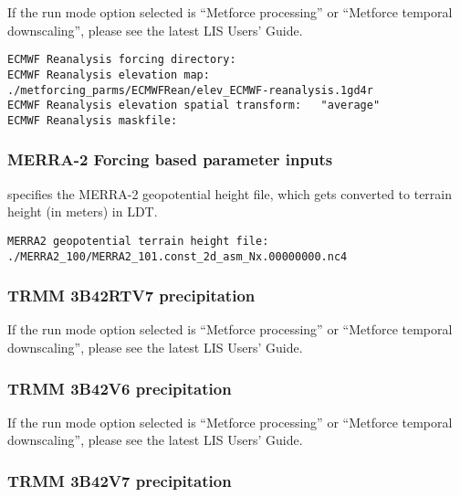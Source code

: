 If the run mode option selected is ``Metforce processing'' or
 ``Metforce temporal downscaling'', please see the latest LIS Users'
 Guide.

 

 \begin{Verbatim}[frame=single]
ECMWF Reanalysis forcing directory:
ECMWF Reanalysis elevation map: ./metforcing_parms/ECMWFRean/elev_ECMWF-reanalysis.1gd4r
ECMWF Reanalysis elevation spatial transform:   "average"
ECMWF Reanalysis maskfile:
 \end{Verbatim}


 
 \subsubsection{MERRA-2 Forcing based parameter inputs}

  specifies 
  the MERRA-2 geopotential height file, which gets
  converted to terrain height (in meters) in LDT.

 

 \begin{Verbatim}[frame=single]
MERRA2 geopotential terrain height file: ./MERRA2_100/MERRA2_101.const_2d_asm_Nx.00000000.nc4
 \end{Verbatim}


 
 \subsubsection{TRMM 3B42RTV7 precipitation}

 If the run mode option selected is ``Metforce processing'' or
 ``Metforce temporal downscaling'', please see the latest LIS Users'
 Guide.

 

 
 \subsubsection{TRMM 3B42V6 precipitation} 

 If the run mode option selected is ``Metforce processing'' or
 ``Metforce temporal downscaling'', please see the latest LIS Users'
 Guide.

 

 
 \subsubsection{TRMM 3B42V7 precipitation} 

